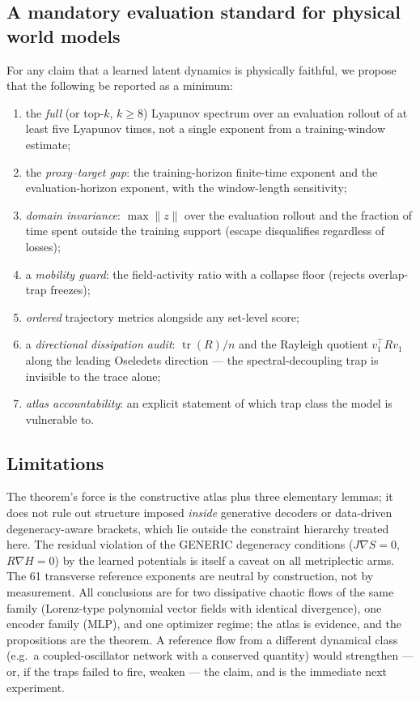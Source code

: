 \documentclass[11pt]{article}
\newcommand{\tr}{\operatorname{tr}}
\newcommand{\grad}{\nabla}
\begin{document}
\subsection{A mandatory evaluation standard for physical world models}
\label{sec:standard}
For any claim that a learned latent dynamics is physically faithful, we
propose that the following be reported as a minimum:
\begin{enumerate}
\item the \emph{full} (or top-$k$, $k\ge 8$) Lyapunov spectrum over an
evaluation rollout of at least five Lyapunov times, not a single exponent
from a training-window estimate;
\item the \emph{proxy--target gap}: the training-horizon finite-time
exponent and the evaluation-horizon exponent, with the window-length
sensitivity;
\item \emph{domain invariance}: $\max\|z\|$ over the evaluation rollout
and the fraction of time spent outside the training support (escape
disqualifies regardless of losses);
\item a \emph{mobility guard}: the field-activity ratio with a collapse
floor (rejects overlap-trap freezes);
\item \emph{ordered} trajectory metrics alongside any set-level score;
\item a \emph{directional dissipation audit}: $\tr(R)/n$ and the Rayleigh
quotient $v_1^\top R v_1$ along the leading Oseledets direction --- the
spectral-decoupling trap is invisible to the trace alone;
\item \emph{atlas accountability}: an explicit statement of which trap
class the model is vulnerable to.
\end{enumerate}

\subsection{Limitations}
The theorem's force is the constructive atlas plus three elementary
lemmas; it does not rule out structure imposed \emph{inside} generative
decoders or data-driven degeneracy-aware brackets, which lie outside the
constraint hierarchy treated here. The residual violation of the GENERIC
degeneracy conditions ($J\grad S=0$, $R\grad H=0$) by the learned
potentials is itself a caveat on all metriplectic arms. The 61 transverse
reference exponents are neutral by construction, not by measurement.
All conclusions are for two dissipative chaotic flows of the same
family (Lorenz-type polynomial vector fields with identical divergence),
one encoder family (MLP), and one optimizer regime; the atlas is
evidence, and the propositions are the theorem. A reference flow from a
different dynamical class (e.g.\ a coupled-oscillator network with a
conserved quantity) would strengthen --- or, if the traps failed to
fire, weaken --- the claim, and is the immediate next experiment.
\end{document}
